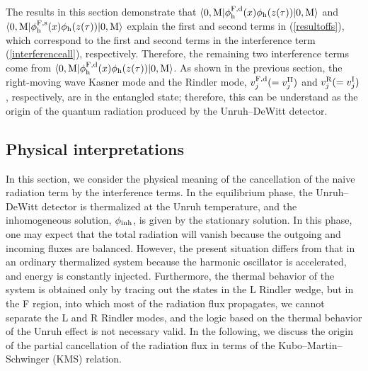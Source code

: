 \documentclass[aps,prd,preprintnumbers,nofootinbib,showpacs]{revtex4}%
\begin{document}
\begin{widetext}
The results in this section demonstrate that 
$\langle0,{\rm M}| \phi_{\rm h}^{\rm F,d}(x) \phi_{\rm h}(z(\tau))|0,{\rm M}\rangle$
and 
$\langle0,{\rm M}| \phi_{\rm h}^{\rm F,s}(x) \phi_{\rm h}(z(\tau))|0,{\rm M}\rangle$
explain the first and second terms in (\ref{resultoffs}), 
which correspond to the first and second terms in 
the interference term (\ref{interferenceall}), respectively. 
Therefore, the remaining two interference terms come from 
$\langle0,{\rm M}| \phi_{\rm h}^{\rm F,d}(x) \phi_{\rm h}(z(\tau))|0,{\rm M}\rangle$. 
As shown in the previous section, 
the right-moving wave Kasner mode and the Rindler mode, 
$v_j^{\rm F,d}(=v^{\rm II}_j)$ and $v_j^{\rm R}(=v^{\rm I}_j)$, respectively, are in the entangled state; 
therefore, this can be understand as the origin of the quantum radiation produced 
by the Unruh--DeWitt detector. 

\subsection{Physical interpretations}
In this section, we consider the physical meaning of the cancellation of the
naive radiation term by the interference terms. 
In the equilibrium phase, the Unruh--DeWitt detector is thermalized at the Unruh temperature, 
and the inhomogeneous solution, $\phi_{\rm inh}$, is given by the stationary solution. 
In this phase, one may expect that the total radiation will vanish because 
the outgoing and incoming fluxes are balanced.
However, the present situation differs from that in an ordinary thermalized system because 
the harmonic oscillator is accelerated, and energy is constantly injected. 
Furthermore, the thermal behavior of the system is obtained only by tracing out the
states in the L Rindler wedge, but in the F region, into which most of the radiation flux propagates, 
we cannot separate the L and R Rindler modes, and 
the logic based on the thermal behavior of the Unruh effect is not necessary valid. 
In the following, we discuss the origin of the partial cancellation
of the radiation flux in terms of the Kubo--Martin--Schwinger (KMS) relation.


\end{widetext}
\end{document}
